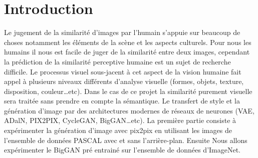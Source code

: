 \chapter{Introduction}

Le jugement de la similarité d’images par l’humain s’appuie sur beaucoup de choses notamment les éléments de la scène et les aspects culturels. Pour nous les humains il nous est facile de juger de la similarité entre deux images, cependant la prédiction de la similarité perceptive humaine est un sujet de recherche difficile. Le processus visuel sous-jacent à cet aspect de la vision humaine fait appel à plusieurs niveaux différents d’analyse visuelle (formes, objets, texture, disposition, couleur…etc). Dans le cas de ce projet la similarité purement visuelle sera traitée sans prendre en compte la sémantique. Le transfert de style et la génération d’image par des architectures modernes de réseaux de neurones (VAE, ADalN, PIX2PIX, CycleGAN, BigGAN…etc). La première partie consiste à expérimenter la génération d’image avec pix2pix en utilisant les images de l’ensemble de données PASCAL avec et sans l’arrière-plan. Ensuite Nous allons expérimenter le BigGAN pré entrainé sur l’ensemble de données d’ImageNet.